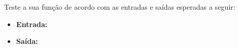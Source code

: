 \begin{enumerate}[label=\textbf{Q\arabic*.}]
Teste a sua função de acordo com as entradas e saídas esperadas a seguir:
\begin{itemize}
    \item \textbf{Entrada:} 
    \item \textbf{Saída:} 
\end{itemize}



\end{enumerate}